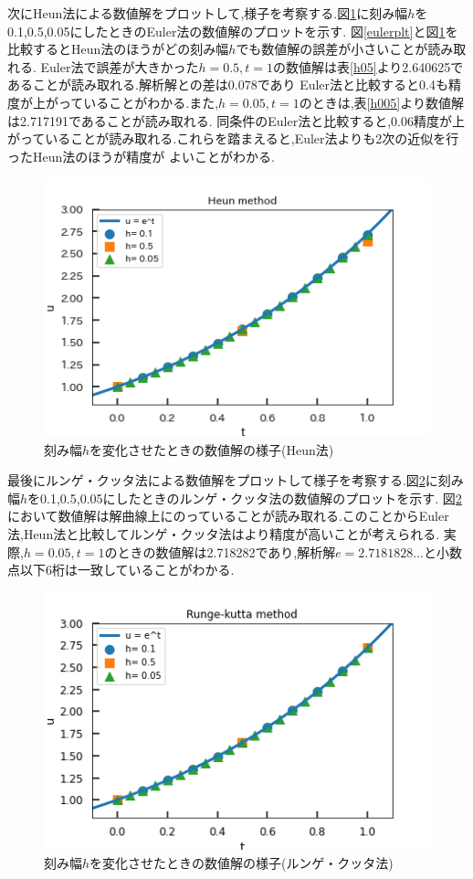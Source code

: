 \documentclass[dvipdfmx]{jarticle}
\begin{document}
    次にHeun法による数値解をプロットして,様子を考察する.図\ref{heunplt}に刻み幅$h$を0.1,0.5,0.05にしたときのEuler法の数値解のプロットを示す.
    図\ref{eulerplt}と図\ref{heunplt}を比較するとHeun法のほうがどの刻み幅$h$でも数値解の誤差が小さいことが読み取れる.
    Euler法で誤差が大きかった$h=0.5,t=1$の数値解は表\ref{h05}より2.640625であることが読み取れる.解析解との差は0.078であり
    Euler法と比較すると0.4も精度が上がっていることがわかる.また,$h=0.05,t=1$のときは,表\ref{h005}より数値解は2.717191であることが読み取れる.
    同条件のEuler法と比較すると,0.06精度が上がっていることが読み取れる.これらを踏まえると,Euler法よりも2次の近似を行ったHeun法のほうが精度が
    よいことがわかる.
    \begin{figure}[H]
      \centering
      \includegraphics[scale=0.75]{kadai4.png}
      \caption{刻み幅$h$を変化させたときの数値解の様子(Heun法)}
       \label{heunplt}
      \end{figure}

    最後にルンゲ・クッタ法による数値解をプロットして様子を考察する.図\ref{RKplt}に刻み幅$h$を0.1,0.5,0.05にしたときのルンゲ・クッタ法の数値解のプロットを示す.
    図\ref{RKplt}において数値解は解曲線上にのっていることが読み取れる.このことからEuler法,Heun法と比較してルンゲ・クッタ法はより精度が高いことが考えられる.
    実際,$h=0.05,t=1$のときの数値解は2.718282であり,解析解$e=2.7181828...$と小数点以下6桁は一致していることがわかる.
    \begin{figure}[H]
      \centering
      \includegraphics[scale=0.75]{kadai5.png}
      \caption{刻み幅$h$を変化させたときの数値解の様子(ルンゲ・クッタ法)}
       \label{RKplt}
      \end{figure}
\end{document}
